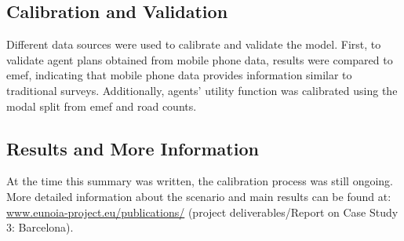 \subsection{Calibration and Validation}
Different data sources were used to calibrate and validate the model. First, to validate agent plans obtained from mobile phone data, results were compared to \gls{emef}, indicating that mobile phone data provides information similar to traditional surveys. Additionally, agents' utility function was calibrated using the modal split from \gls{emef} and road counts.

\subsection{Results and More Information}
At the time this summary was written, the calibration process was still ongoing. More detailed information about the scenario and main results can be found at:
\url{www.eunoia-project.eu/publications/} (project deliverables/Report on Case Study 3: Barcelona).


